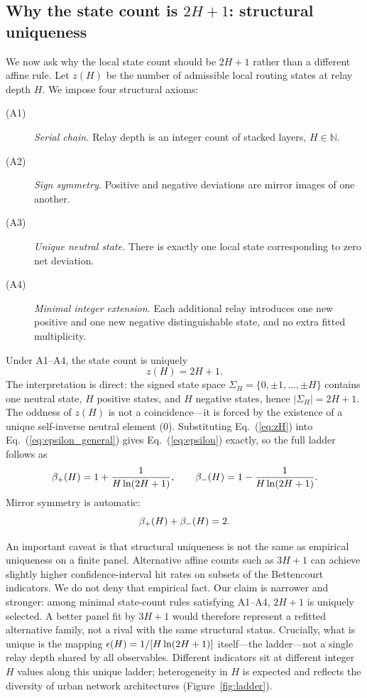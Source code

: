 \subsection{Why the state count is \(2H+1\): structural uniqueness}\label{subsec:structural_uniqueness}

We now ask why the local state count should be \(2H+1\) rather than a different
affine rule.
Let \(z(H)\) be the number of admissible local routing states at relay depth
\(H\).
We impose four structural axioms:
\begin{description}
\item[(A1)] \emph{Serial chain.} Relay depth is an integer count of stacked
layers, \(H\in\mathbb{N}\).
\item[(A2)] \emph{Sign symmetry.} Positive and negative deviations are mirror
images of one another.
\item[(A3)] \emph{Unique neutral state.} There is exactly one local state
corresponding to zero net deviation.
\item[(A4)] \emph{Minimal integer extension.} Each additional relay introduces
one new positive and one new negative distinguishable state, and no extra
fitted multiplicity.
\end{description}
Under A1--A4, the state count is uniquely
\begin{equation}
z(H)=2H+1.
\label{eq:zH}
\end{equation}
The interpretation is direct: the signed state space
$\Sigma_H=\{0,\pm 1,\ldots,\pm H\}$ contains one neutral state, $H$
positive states, and $H$ negative states, hence
$|\Sigma_H|=2H+1$.
The oddness of $z(H)$ is not a coincidence---it is forced by the
existence of a unique self-inverse neutral element ($0$).
Substituting Eq.~(\ref{eq:zH}) into Eq.~(\ref{eq:epsilon_general}) gives
Eq.~(\ref{eq:epsilon}) exactly, so the full ladder follows as
\begin{equation}
\beta_+\!\left(H\right)=1+\frac{1}{H\ln(2H+1)},\qquad
\beta_-\!\left(H\right)=1-\frac{1}{H\ln(2H+1)}.
\label{eq:ladder_explicit}
\end{equation}
Mirror symmetry is automatic:
\begin{equation}
\beta_+\!\left(H\right)+\beta_-\!\left(H\right)=2.
\label{eq:mirror}
\end{equation}

An important caveat is that structural uniqueness is not the same as empirical uniqueness on a finite
panel.
Alternative affine counts such as \(3H+1\) can achieve slightly higher
confidence-interval hit rates on subsets of the Bettencourt indicators.
We do not deny that empirical fact.
Our claim is narrower and stronger: among minimal state-count rules satisfying
A1--A4, \(2H+1\) is uniquely selected.
A better panel fit by \(3H+1\) would therefore represent a refitted
alternative family, not a rival with the same structural status.
Crucially, what is unique is the mapping
\(\epsilon\!\left(H\right)=1/[H\ln(2H+1)]\) itself---the ladder---not a single relay depth
shared by all observables.
Different indicators sit at different integer \(H\) values along this unique
ladder; heterogeneity in \(H\) is expected and reflects the diversity of
urban network architectures (Figure~\ref{fig:ladder}).

